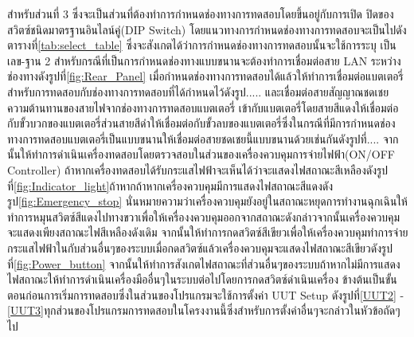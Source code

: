 สำหรับส่วนที่ 3 ซึ่งจะเป็นส่วนที่ต้องทำการกำหนดช่องทางการทดสอบโดยขึ้นอยู่กับการเปิด ปิดของสวิตซ์ชนิดมาตรฐานอินไลน์คู่(DIP Switch)
โดยแนวทางการกำหนดช่องทางการทดสอบจะเป็นไปดังตารางที่\ref{tab:select_table} ซึ่งจะสังเกตได้ว่าการกำหนดช่องทางการทดสอบนั้นจะใช้การระบุ
เป็นเลข-ฐาน 2 สำหรับกรณีที่เป็นการกำหนดช่องทางแบบขนานจะต้องทำการเชื่อมต่อสาย LAN ระหว่างช่องทางดังรูปที่\ref{fig:Rear_Panel} เมื่อกำหนดช่องทางการทดสอบได้แล้วให้ทำการเชื่อมต่อแบตเตอรี่สำหรับการทดสอบกับช่องทางการทดสอบที่ได้กำหนดไว้ดังรูป..... และเชื่อมต่อสายสัญญาณชดเชยความต้านทานของสายไฟจากช่องทางการทดสอบแบตเตอรี่
เข้ากับแบตเตอรี่โดยสายสีแดงให้เชื่อมต่อกับขั้วบวกของแบตเตอรี่ส่วนสายสีดำให้เชื่อมต่อกับขั้วลบของแบตเตอรี่ซึ่งในกรณีที่มีการกำหนดช่องทางการทดสอบแบตเตอรี่เป็นแบบขนานให้เชื่อมต่อสายชดเชยนี้แบบขนานด้วยเช่นกันดังรูปที่....
จากนั้นให้ทำการดำเนินเครื่องทดสอบโดยตรวจสอบในส่วนของเครื่องควบคุมการจ่ายไฟฟ้า(ON/OFF Controller)
ถ้าหากเครื่องทดสอบได้รับกระแสไฟฟ้าจะเห็นได้ว่าจะแสดงไฟสถาณะสีเหลืองดังรูปที่\ref{fig:Indicator_light}ถ้าหากถ้าหากเครื่องควบคุมมีการแสดงไฟสถาณะสีแดงดังรูป\ref{fig:Emergency_stop} นั่นหมายความว่าเครื่องควบคุมยังอยู่ในสถาณะหยุดการทำงานฉุกเฉินให้ทำการหมุนสวิตซ์สีแดงไปทางขวาเพื่อให้เครื่องงควบคุมออกจากสถาณะดังกล่าวจากนั้นเครื่องควบคุมจะแสดงเพียงสถาณะไฟสีเหลืองดังเดิม จากนั้นให้ทำการกดสวิตซ์สีเขียวเพื่อให้เครื่องควบคุมทำการจ่ายกระแสไฟฟ้าในกับส่วนอื่นๆของระบบเมื่อกดสวิตซ์แล้วเครื่องควบคุมจะแสดงไฟสถาณะสีเขียวดังรูปที่\ref{fig:Power_button}
จากนั้นให้ทำการสังเกตไฟสถาณะที่ส่วนอื่นๆของระบบถ้าหากไม่มีการแสดงไฟสถาณะให้ทำการดำเนินเครื่องมืออื่นๆในระบบต่อไปโดยการกดสวิตซ์ดำเนินเครื่อง
\newline 
\hspace*{2cm}
ข้างต้นเป็นขั้นตอนก่อนการเริ่มการทดสอบซึ่งในส่วนของโปรแกรมจะใช้การตั้งค่า UUT Setup 
ดังรูปที่\ref{UUT2} - \ref{UUT3}ทุกส่วนของโปรแกรมการทดสอบในโครงงานนี้ซึ่งสำหรับการตั้งค่าอื่นๆจะกล่าวในหัวข้อถัดๆไป
